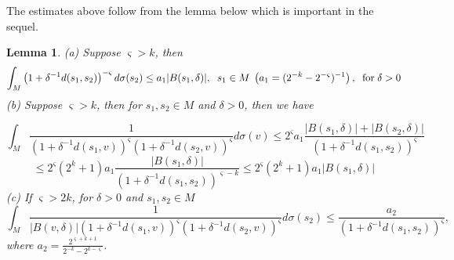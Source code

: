 \documentclass[10pt]{article}
\newtheorem{lem}[thm]{Lemma}
\theoremstyle{definition}
\numberwithin{equation}{section}
\begin{document}
	The estimates above follow from the lemma below which is important in the sequel.
	\begin{lem}
		\normalfont
		(a) Suppose $\varsigma>k$, then
		\begin{equation}\label{L}
			\int_M \left(1 + \delta^{-1} d(s_1,s_2)\right) ^{-\varsigma} d \sigma (s_2) \leq a_1 |B(s_1, \delta)|, \hspace{0.2 cm} s_1 \in M \hspace{0.1 cm} \left(a_1 = (2^{-k} - 2^{-\varsigma})^{-1} \right), \hspace{0.2 cm} \mbox{for} \hspace{0.1 cm} \delta>0
		\end{equation}
		(b) Suppose $\varsigma>k$, then for $s_1,s_2 \in M$ and $\delta>0$, then we have
		
		\begin{equation*}
			\int_{M} \frac{1}{\left(1 + \delta^{-1} d(s_1,v) \right)^{\varsigma} \left(1 + \delta^{-1} d(s_2,v) \right)^{\varsigma}} d\sigma(v)\leq 2^{\varsigma} a_1 \frac{|B(s_1,\delta)| + |B(s_2, \delta)|}{\left(1 + \delta^{-1} d(s_1,s_2) \right)^{\varsigma}}
		\end{equation*}
		\begin{equation}\label{M}
			\leq 2^{\varsigma} (2^k +1) a_1 \frac{|B(s_1,\delta)|}{\left(1 + \delta^{-1} d(s_1,s_2) \right)^{\varsigma -k}} \leq 2^{\varsigma}(2^k+1)a_1|B(s_1,\delta)|
		\end{equation}
		(c) If $\varsigma>2k$, for $\delta>0$ and $s_1,s_2 \in M$
		\begin{equation}\label{N}
			\int_{M} \frac{1}{|B(v,\delta)| \left(1 + \delta^{-1} d(s_1,v) \right)^{\varsigma} \left(1 + \delta^{-1} d(s_2,v) \right)^{\varsigma}} d\sigma(s_2) \leq \frac{a_2}{\left(1 + \delta^{-1} d(s_1,s_2) \right)^{\varsigma}},
		\end{equation}
		where $ a_2 = \frac{2^{\varsigma +k + 1}}{2^{-k} - 2^{k-\varsigma}}$.\\
	\end{lem}
\end{document}
